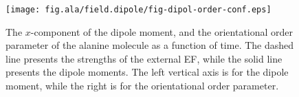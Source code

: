 \documentclass[a4paper,preprint,unsortedaddress,onecolumn]{revtex4-1}
\begin{document}



\begin{figure}
  \centering
  \texttt{[image: fig.ala/field.dipole/fig-dipol-order-conf.eps]}
  \caption{The
    $x$-component of the dipole moment, and the orientational order parameter
    of the alanine molecule as a
    function of time. The dashed line presents the strengths of the
    external EF, while the solid line presents the dipole
    moments. The left vertical axis is for the dipole moment, while
    the right is for the orientational order parameter.
  }
  \label{fig:tmp3}
\end{figure}
\end{document}
